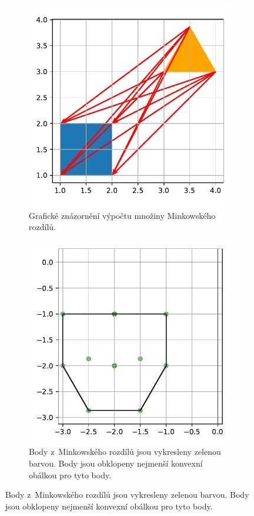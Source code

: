 \begin{figure}
     \begin{subfigure}[t]{0.45\textwidth}
    
    \centering
    \includegraphics[scale=0.7]{obrazky-figures/gjk/minkowksi_desc.pdf}
    \caption{Grafické znázornění výpočtu množiny Minkowského rozdílů.
    }
    \label{fig:minikowski-dif}
    
\end{subfigure}
    \hfill
\begin{subfigure}[t]{0.45\textwidth}
    
    \centering
    \includegraphics[scale=0.7]{obrazky-figures/gjk/minkowksi_c.pdf}
    \caption{Body z~Minkowského rozdílů jsou vykresleny zelenou barvou. Body jsou obklopeny nejmenší konvexní obálkou pro tyto body.}
    \label{fig:minikowski-c}
    

\end{subfigure}
\end{figure}
